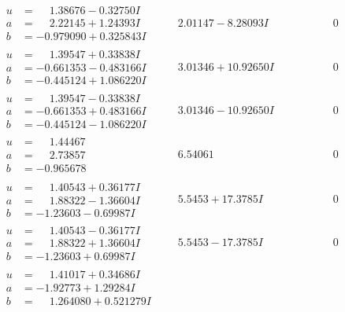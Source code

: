 \documentclass[1p]{elsarticle_modified}
\theoremstyle{definition}
\begin{document}
$$\begin{array}{c|c|c}
\begin{aligned}
u &= \phantom{-}1.38676 - 0.32750 I \\
a &= \phantom{-}2.22145 + 1.24393 I \\
b &= -0.979090 + 0.325843 I\end{aligned}
 & \phantom{-}2.01147 - 8.28093 I & \phantom{-0.000000 } 0 \\ \hline\begin{aligned}
u &= \phantom{-}1.39547 + 0.33838 I \\
a &= -0.661353 - 0.483166 I \\
b &= -0.445124 + 1.086220 I\end{aligned}
 & \phantom{-}3.01346 + 10.92650 I & \phantom{-0.000000 } 0 \\ \hline\begin{aligned}
u &= \phantom{-}1.39547 - 0.33838 I \\
a &= -0.661353 + 0.483166 I \\
b &= -0.445124 - 1.086220 I\end{aligned}
 & \phantom{-}3.01346 - 10.92650 I & \phantom{-0.000000 } 0 \\ \hline\begin{aligned}
u &= \phantom{-}1.44467\phantom{ +0.000000I} \\
a &= \phantom{-}2.73857\phantom{ +0.000000I} \\
b &= -0.965678\phantom{ +0.000000I}\end{aligned}
 & \phantom{-}6.54061\phantom{ +0.000000I} & \phantom{-0.000000 } 0 \\ \hline\begin{aligned}
u &= \phantom{-}1.40543 + 0.36177 I \\
a &= \phantom{-}1.88322 - 1.36604 I \\
b &= -1.23603 - 0.69987 I\end{aligned}
 & \phantom{-}5.5453 + 17.3785 I & \phantom{-0.000000 } 0 \\ \hline\begin{aligned}
u &= \phantom{-}1.40543 - 0.36177 I \\
a &= \phantom{-}1.88322 + 1.36604 I \\
b &= -1.23603 + 0.69987 I\end{aligned}
 & \phantom{-}5.5453 - 17.3785 I & \phantom{-0.000000 } 0 \\ \hline\begin{aligned}
u &= \phantom{-}1.41017 + 0.34686 I \\
a &= -1.92773 + 1.29284 I \\
b &= \phantom{-}1.264080 + 0.521279 I\end{aligned}

\end{array}$$
\end{document}
